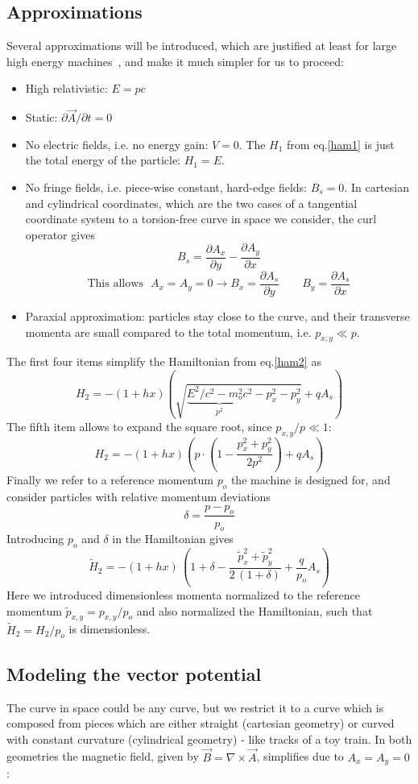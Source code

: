 \documentclass[12pt]{article}
\newcommand{\see}{\mbox{$\rightarrow$}}
\newcommand\beq{\begin{equation}}
\newcommand\eeq{\end{equation}}
\begin{document}
\subsection{\label{ssechamapp}Approximations}
Several approximations will be introduced, which are justified at least for
large high energy machines~\cite{es}, and make it much simpler for us to proceed:
\begin{itemize}
\item High relativistic: $E=pc$
\item Static: $\partial \vec{A} / \partial t=0$
\item No electric fields, i.e. no energy gain: $V=0$. The $H_1$ from eq.\ref{ham1} is just the total energy of the particle: $H_1=E$.
\item No fringe fields, i.e. piece-wise constant, hard-edge fields: $B_s=0$.
In cartesian and cylindrical coordinates, which are the two cases of a tangential coordinate system to
a torsion-free curve in space we consider, the curl operator gives
\[ B_s=\frac{\partial A_x}{\partial y}- \frac{\partial A_y}{\partial x}\]
\[ \mbox{This allows~~} A_x=A_y=0 \see
B_x=\frac{\partial A_s}{\partial y} \qquad B_y=\frac{\partial A_s}{\partial x} \]
\item Paraxial approximation: particles stay close to the curve, and their transverse momenta
are small compared to the total momentum, i.e. $p_{x,y}\ll p$.
\end{itemize}
The first four items simplify the Hamiltonian from eq.\ref{ham2} as
\beq
H_2 = -(1+hx) \left( \sqrt{ \underbrace{E^2/c^2-m_o^2c^2}_{p^2} -p_x^2-p_y^2} + qA_s\right)
\eeq
The fifth item allows to expand the square root, since $p_{x,y}/p\ll 1$:
\beq
H_2 = -(1+hx) \left( p\cdot \left( 1- \frac{p_x^2+p_y^2}{2p^2}\right) + qA_s\right)
 \eeq
Finally we refer to a reference momentum $p_o$ the machine is designed for, and consider
particles with relative momentum deviations
\beq
\delta = \frac{p-p_o}{p_o}
\eeq
Introducing $p_o$ and $\delta$ in the Hamiltonian gives
\beq\label{tham2}
\tilde{H}_2 = -(1+hx)\, \left( 1+\delta - \frac{\tilde{p}_x^2+\tilde{p}_y^2}{2\,(1+\delta)}+\frac{q}{p_o}A_s \right)
\eeq
Here we introduced dimensionless momenta normalized to the reference momentum  $\tilde{p}_{x,y}=p_{x,y}/p_o$ and also normalized the Hamiltonian, such that $\tilde{H}_2=H_2/p_o$ is dimensionless.

\subsection{Modeling the vector potential}
The curve in space could be any curve, but we restrict it to a curve which is composed
from pieces which are either straight (cartesian geometry) or curved with constant curvature (cylindrical geometry) - like tracks of a toy train. In both geometries the magnetic field,
given by $\vec{B}= \nabla\times\vec{A}$, simplifies due to $A_x=A_y=0$:
\end{document}
